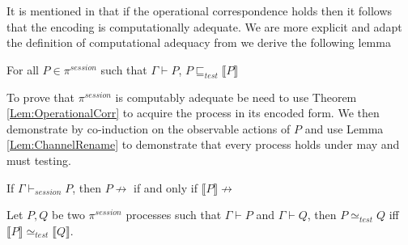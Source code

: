 It is mentioned in \citep{sangiorgi2003pi} that if the operational correspondence holds then it follows that the encoding is computationally adequate. We are more explicit and adapt the definition of computational adequacy from \citep{demangeon2011full} we derive the following lemma
\vspace{10pt}
\begin{lemma}[Adequacy]
    For all $P \in \pi^{session}$ such that $\Gamma \vdash P$, $P \sqsubseteq_{test} \llbracket P \rrbracket$
    \label{Lem:Adequacy}
\end{lemma}

To prove that $\pi^{session}$ is computably adequate be need to use Theorem \ref{Lem:OperationalCorr} to acquire the process in its encoded form. We then demonstrate by co-induction on the observable actions of $P$ and use Lemma \ref{Lem:ChannelRename} to demonstrate that every process holds under may and must testing.

\begin{lemma}[Blockingness]
    If $\Gamma \vdash_{session} P$, then $P \not \rightarrow$ if and only if $\llbracket P \rrbracket \not \rightarrow$
    \label{lem:blocking}
\end{lemma}

\vspace{10pt}
\begin{theorem}
    Let $P, Q$ be two $\pi^{session}$ processes such that $\Gamma \vdash P$ and $\Gamma \vdash Q$, then $P \simeq_{test} Q$ iff $\llbracket P \rrbracket \simeq_{test} \llbracket Q \rrbracket$.
    \label{Th:FullAbstraction}
\end{theorem}

